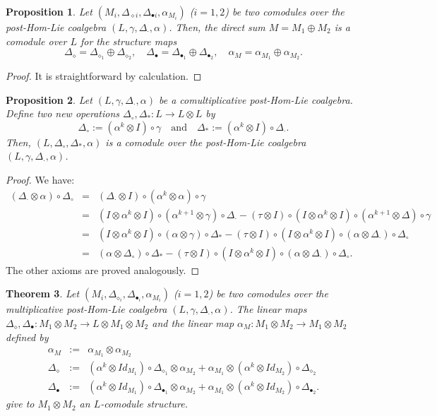 \documentclass{article}
\newtheorem{thm}{Theorem}[section]
\newtheorem{prop}[thm]{Proposition}
\theoremstyle{definition}
\theoremstyle{remark}
\numberwithin{equation}{section}
\begin{document}
\begin{prop}
 Let $(M_i, \Delta_{\diamond i}, \Delta_{\bullet i}, \alpha_{M_i})$ ($i=1, 2$) be two comodules over the post-Hom-Lie coalgebra $(L, \gamma, \Delta_\cdot, \alpha)$.
Then, the direct sum $M=M_1\oplus M_2$ is a comodule over $L$ for the structure maps
$$\Delta_\diamond=\Delta_{\diamond_1}\oplus\Delta_{\diamond_2}, \quad \Delta_\bullet=\Delta_{\bullet_1}\oplus\Delta_{\bullet_2},\quad\alpha_M=\alpha_{M_1}\oplus\alpha_{M_2}.$$
\end{prop}
\begin{proof}
It is straightforward by calculation.
\end{proof}
\begin{prop}\label{nph}
  Let $(L, \gamma, \Delta_\cdot, \alpha)$ be a comultiplicative post-Hom-Lie coalgebra. Define two new operations $\Delta_\circ, \Delta_\ast : L\rightarrow L\otimes L$
by
$$\Delta_\circ:=(\alpha^k\otimes I)\circ\gamma\quad\mbox{and}\quad \Delta_\ast :=(\alpha^k\otimes I)\circ\Delta_\cdot.$$
Then, $(L, \Delta_\circ, \Delta_\ast, \alpha)$ is a comodule over the post-Hom-Lie coalgebra $(L, \gamma, \Delta_\cdot, \alpha)$.
\end{prop}
\begin{proof}
 We have:
\begin{eqnarray}
 (\Delta_\cdot\otimes\alpha)\circ\Delta_\circ &=&(\Delta_\cdot\otimes I)\circ(\alpha^k\otimes\alpha)\circ\gamma\nonumber\\
&=&(I\otimes\alpha^k\otimes I)\circ(\alpha^{k+1}\otimes\gamma)\circ\Delta_\cdot-(\tau\otimes I)\circ(I\otimes\alpha^k\otimes I)\circ(\alpha^{k+1}\otimes\Delta)\circ\gamma\nonumber\\
&=&(I\otimes\alpha^k\otimes I)\circ(\alpha\otimes\gamma)\circ\Delta_\ast-(\tau\otimes I)\circ(I\otimes\alpha^k\otimes I)\circ(\alpha\otimes\Delta_\cdot)\circ\Delta_\circ\nonumber\\
&=&(\alpha\otimes\Delta_\circ)\circ\Delta_\ast-(\tau\otimes I)\circ(I\otimes\alpha^k\otimes I)\circ(\alpha\otimes\Delta_\cdot)\circ\Delta_\circ.\nonumber
\end{eqnarray}
The other axioms are proved analogously.
\end{proof}
\begin{thm}\label{mpm}
Let $(M_i, \Delta_{\diamond_i}, \Delta_{\bullet_i}, \alpha_{M_i})$ ($i=1, 2$) be two comodules over the multiplicative post-Hom-Lie coalgebra
 $(L, \gamma, \Delta_\cdot, \alpha)$.
The linear maps $\Delta_\diamond, \Delta_\bullet :  M_1\otimes M_2\rightarrow L\otimes M_1\otimes M_2$ and the linear map
 $\alpha_M : M_1\otimes M_2\rightarrow M_1\otimes M_2$ defined by
 \begin{eqnarray}
\alpha_M&:=&\alpha_{M_1}\otimes\alpha_{M_2}\nonumber\\
  \Delta_\diamond &:=&(\alpha^k\otimes Id_{M_1})\circ\Delta_{\diamond_1} \otimes\alpha_{M_2}+    \alpha_{M_1}\otimes(\alpha^k\otimes Id_{M_2})\circ\Delta_{\diamond_2} \nonumber\\
   \Delta_\bullet &:=&(\alpha^k\otimes Id_{M_1})\circ\Delta_{\bullet_1} \otimes\alpha_{M_2}+    \alpha_{M_1}\otimes(\alpha^k\otimes Id_{M_2})\circ\Delta_{\bullet_2} \nonumber.
 \end{eqnarray}
give to $M_1\otimes M_2$ an $L$-comodule structure.
\end{thm}
\end{document}
